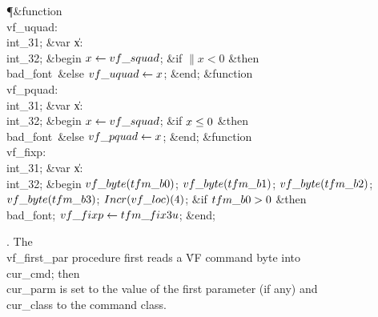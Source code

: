 \Y\P\4\&{function}\1\  \\{vf\_uquad}: \\{int\_31};\6
\4\&{var} \|x: \\{int\_32};\2\6
\&{begin} $\hbox{$x$}\gets\\{vf\_squad}$;\6
\&{if} $\|x<0$ \1\&{then}\5
\\{bad\_font}\ \&{else} $\\{vf\_uquad}\gets\hbox{$x$}$;\2\6
\&{end};\7
\4\&{function}\1\  \\{vf\_pquad}: \\{int\_31};%
\6
\4\&{var} \|x: \\{int\_32};\2\6
\&{begin} $\hbox{$x$}\gets\\{vf\_squad}$;\6
\&{if} $\hbox{$x$}\le0$ \1\&{then}\5
\\{bad\_font}\ \&{else} $\\{vf\_pquad}\gets\hbox{$x$}$;\2\6
\&{end};\7
\4\&{function}\1\  \\{vf\_fixp}: \\{int\_31};\6
\4\&{var} \|x: \\{int\_32};\2\6
\&{begin} $\\{vf\_byte}(\\{tfm\_b0})$;\5
$\\{vf\_byte}(\\{tfm\_b1})$;\5
$\\{vf\_byte}(\\{tfm\_b2})$;\5
$\\{vf\_byte}(\\{tfm\_b3})$;\5
$\\{Incr}(\\{vf\_loc})(4)$;\6
\&{if} $\\{tfm\_b0}>0$ \1\&{then}\5
\\{bad\_font};\2\6
$\\{vf\_fixp}\gets\\{tfm\_fix3u}$;\6
\&{end};\par
\fi

. The \\{vf\_first\_par} procedure first reads a \.{VF} command byte into
\\{cur\_cmd}; then \\{cur\_parm} is set to the value of the first parameter
(if any) and \\{cur\_class} to the command class.

